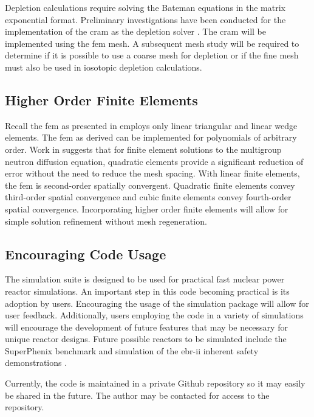     Depletion calculations require solving the Bateman equations in the matrix
    exponential format. Preliminary investigations have been conducted for the
    implementation of the \gls{cram} as the depletion solver \cite{cram}. The 
    \gls{cram} will be implemented using the \gls{fem} mesh. A subsequent mesh 
    study will be required to determine if it is possible to use a coarse mesh 
    for depletion or if the fine mesh must also be used in iosotopic depletion 
    calculations.

  \subsection{Higher Order Finite Elements}
    Recall the \gls{fem} as presented in  employs
    only linear triangular and linear wedge elements. The \gls{fem} as derived 
    can be implemented for polynomials of arbitrary order. Work in 
    \cite{Hosseini2013} suggests that for finite element solutions to the
    multigroup neutron diffusion equation, quadratic elements provide a 
    significant reduction of error without the need to reduce the mesh spacing. 
    With linear finite elements, the \gls{fem} is second-order spatially 
    convergent. Quadratic finite elements convey third-order spatial convergence 
    and cubic finite elements convey fourth-order spatial convergence. 
    Incorporating higher order finite elements will allow for simple solution 
    refinement without mesh regeneration.

  \subsection{Encouraging Code Usage}
    The simulation suite is designed to be used for practical fast nuclear power
    reactor simulations. An important step in this code becoming practical is 
    its adoption by users. Encouraging the usage of the simulation package will
    allow for user feedback. Additionally, users employing the code in a variety
    of simulations will encourage the development of future features that may be
    necessary for unique reactor designs. Future possible reactors to be 
    simulated include the SuperPhenix benchmark and simulation of the
    \gls{ebr-ii} inherent safety demonstrations \cite{ebriitests}.
    
    \renewcommand{\thefootnote}{\fnsymbol{footnote}}
    Currently, the code is maintained in a private Github repository so it may 
    easily be shared in the future. The author may be contacted\footnotemark 
    for access to the repository. 



\glsresetall
